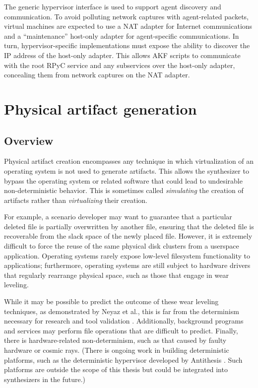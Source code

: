 The generic hypervisor interface is used to support agent discovery and
communication. To avoid polluting network captures with agent-related
packets, virtual machines are expected to use a NAT adapter for Internet
communications and a ``maintenance'' host-only adapter for
agent-specific communications. In turn, hypervisor-specific
implementations must expose the ability to discover the IP address of
the host-only adapter. This allows AKF scripts to communicate with the
root RPyC service and any subservices over the host-only adapter,
concealing them from network captures on the NAT adapter.

\section{Physical artifact
generation}\label{physical-artifact-generation}

\subsection{Overview}\label{overview}

Physical artifact creation encompasses any technique in which
virtualization of an operating system is not used to generate artifacts.
This allows the synthesizer to bypass the operating system or related
software that could lead to undesirable non-deterministic behavior. This
is sometimes called \emph{simulating} the creation of artifacts rather
than \emph{virtualizing} their creation.

For example, a scenario developer may want to guarantee that a
particular deleted file is partially overwritten by another file,
ensuring that the deleted file is recoverable from the slack space of
the newly placed file. However, it is extremely difficult to force the
reuse of the same physical disk clusters from a userspace application.
Operating systems rarely expose low-level filesystem functionality to
applications; furthermore, operating systems are still subject to
hardware drivers that regularly rearrange physical space, such as those
that engage in wear leveling.

While it may be possible to predict the outcome of these wear leveling
techniques, as demonstrated by Neyaz et al., this is far from the
determinism necessary for research and tool validation
\cite{neyazForensicAnalysisWear2018}. Additionally, background
programs and services may perform file operations that are difficult to
predict. Finally, there is hardware-related non-determinism, such as
that caused by faulty hardware or cosmic rays. (There is ongoing work in
building deterministic platforms, such as the deterministic hypervisor
developed by Antithesis \cite{pshenichkinYouThinkYou2024}. Such
platforms are outside the scope of this thesis but could be integrated
into synthesizers in the future.)


